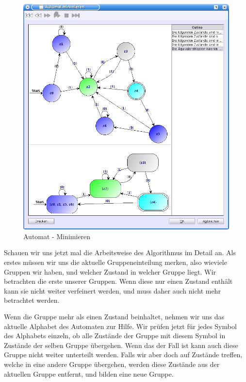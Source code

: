   \begin{figure}[h]
  \begin{center}
  \includegraphics[width=12cm]{../images/minimize.png}
  \caption{Automat - Minimieren}
  \end{center}
  \end{figure}

Schauen wir uns jetzt mal die Arbeitsweise des Algorithmus im Detail an. Als
erstes müssen wir uns die aktuelle Gruppeneinteilung merken, also wieviele
Gruppen wir haben, und welcher Zustand in welcher Gruppe liegt. Wir betrachten
die erste unserer Gruppen. Wenn diese nur einen Zustand enthält kann sie nicht
weiter verfeinert werden, und muss daher auch nicht mehr betrachtet werden.
\vspace{10pt}

Wenn die Gruppe mehr als einen Zustand beinhaltet, nehmen wir uns das aktuelle
Alphabet des Automaten zur Hilfe. Wir prüfen jetzt für jedes Symbol des Alphabets
einzeln, ob alle Zustände der Gruppe mit diesem Symbol in Zustände der selben
Gruppe übergehen. Wenn das der Fall ist kann auch diese Gruppe nicht weiter
unterteilt werden. Falls wir aber doch auf Zustände treffen, welche in eine
andere Gruppe übergehen, werden diese Zustände aus der aktuellen Gruppe entfernt,
und bilden eine neue Gruppe. \vspace{10pt}

